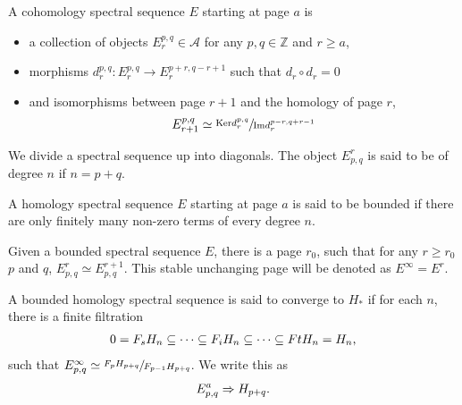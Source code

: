 \documentclass[../thesis.tex]{subfiles}
\begin{document}
        \begin{definition}
            A cohomology spectral sequence $E$ starting at page $a$ is
            \begin{itemize}
                \item a collection of objects $E_r^{p,q} \in \mathcal{A}$ for any $p,q \in \mathbb{Z}$ and $r \geq a$,
                \item morphisms $d_r^{p,q} : E_r^{p,q} \rightarrow E_r^{p+r, q-r+1}$ such that $d_r\circ d_r = 0$
                \item and isomorphisms between page $r+1$ and the homology of page $r$,
                \begin{align*}
                    E_{r+1}^{p,q} \simeq \sfrac{\tt{Ker}d_r^{p,q}}{\tt{Im}d_r^{p-r,q+r-1}}
                \end{align*}
            \end{itemize}
        \end{definition}

        We divide a spectral sequence up into diagonals. The object $E^r_{p,q}$ is said to be of degree $n$ if $n = p + q$.

        \begin{definition}
            A homology spectral sequence $E$ starting at page $a$ is said to be bounded if there are only finitely many non-zero terms of every degree $n$.
        \end{definition}

        Given a bounded spectral sequence $E$, there is a page $r_0$, such that for any $r \geq r_0$ $p$ and $q$, $E^r_{p,q} \simeq E^{r+1}_{p,q}$. This stable unchanging page will be denoted as $E^\infty = E^r$.

        \begin{definition}
            A bounded homology spectral sequence is said to converge to $H_*$ if for each $n$, there is a finite filtration
            \begin{align*}
                0 = F_sH_n \subseteq \cdots \subseteq F_iH_n \subseteq \cdots \subseteq FtH_n = H_n\tt{,}
            \end{align*}
            such that $E^\infty_{p,q} \simeq \sfrac{F_pH_{p+q}}{F_{p-1}H_{p+q}}$. We write this as
            \begin{align*}
                E^a_{p,q} \Rightarrow H_{p+q}\tt{.}
            \end{align*}
        \end{definition}
\end{document}
